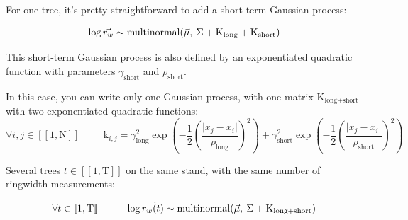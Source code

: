 \documentclass[11pt]{article}
\begin{document}
\vspace{0.5cm}
For one tree, it's pretty straightforward to add a short-term Gaussian process:

\begin{equation}
\log\vec{{r_w}} \sim \text{multinormal}(\vec{\mu}, \hspace{0.08cm} \Sigma + \mathrm{K}_{\text{long}} + \mathrm{K}_{\text{short}})
\end{equation}

This short-term Gaussian process is also defined by an exponentiated quadratic function with parameters $\gamma_{\text{short}}$ and $\rho_{\text{short}}$.
\vspace{0.5cm}

In this case, you can write only one Gaussian process, with one matrix $\mathrm{K}_{\text{long+short}}$ with two exponentiated quadratic functions:
\begin {equation}
\forall i,j  \in [\![1,\mathrm{N}]\!] \hspace{1cm} \mathrm{k}_{i,j} = {\gamma_{\text{long}}^2} \exp\left(-\frac{1}{2}\left(\frac{\lvert x_j-x_i \rvert }{\rho_{\text{long}}}\right)^2\right) + {\gamma_{\text{short}}^2} \exp\left(-\frac{1}{2}\left(\frac{\lvert x_j-x_i \rvert }{\rho_{\text{short}}}\right)^2\right)
\end{equation}

\vspace{0.8cm}
Several trees $t \in [\![1,\mathrm{T}]\!]$ on the same stand, with the same number of ringwidth measurements:

\begin{equation}
\forall t  \in [\![1,\mathrm{T}]\!] \hspace{1cm} \log\vec{{r_w({t})}} \sim \text{multinormal}(\vec{\mu}, \hspace{0.08cm} \Sigma + \mathrm{K}_{\text{long+short}})
\end{equation}
\end{document}
